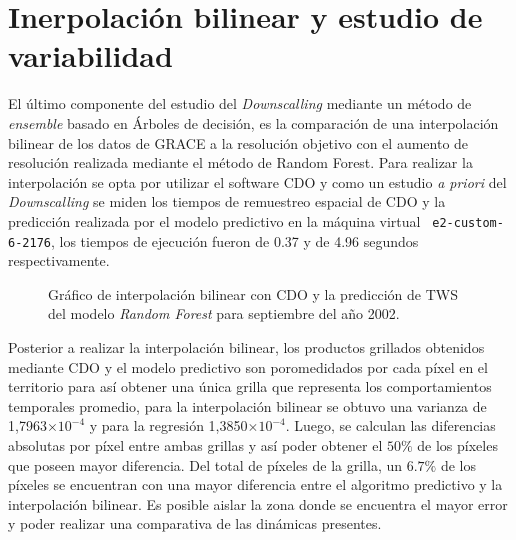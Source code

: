 %
%
%
%

\section{Inerpolación bilinear y estudio de variabilidad}
El último componente del estudio del \textit{Downscalling} mediante un método de \textit{ensemble} basado en Árboles de decisión, es la comparación de una interpolación bilinear de los datos de GRACE a la resolución objetivo
con el aumento de resolución realizada mediante el método de Random Forest. Para realizar la interpolación se opta por utilizar el software CDO y como un estudio \textit{a priori} del \textit{Downscalling} se miden los tiempos de remuestreo
espacial de CDO y la predicción realizada por el modelo predictivo en la máquina virtual \texttt{ e2-custom-6-2176}, los tiempos de ejecución fueron de 0.37 y de 4.96 segundos respectivamente.

\begin{figure}[H]
    \centering
          \goodgap
          \vskip -0.1in
    \caption[Comparación de interpolación bilinear y \textit{Random Forest}]{Gráfico de interpolación bilinear con CDO y la predicción de TWS del modelo \textit{Random Forest} para septiembre del año 2002.}
    \label{interp02}
\end{figure}

Posterior a realizar la interpolación bilinear, los productos grillados obtenidos mediante CDO y el modelo predictivo son poromedidados por cada píxel en el territorio para así obtener una única grilla que representa los comportamientos temporales promedio, para la interpolación bilinear se 
obtuvo una varianza de 1,7963$\times 10^{-4}$ y para la regresión 1,3850$\times 10^{-4}$. Luego,
se calculan las diferencias absolutas por píxel entre ambas grillas y así poder obtener el $50\%$ de los píxeles que poseen mayor diferencia. Del total de píxeles de la grilla, un $6.7\%$ de los píxeles se encuentran con una mayor diferencia entre el algoritmo predictivo y la interpolación bilinear.
Es posible aislar la zona donde se encuentra el mayor error y poder realizar una comparativa de las dinámicas presentes.

